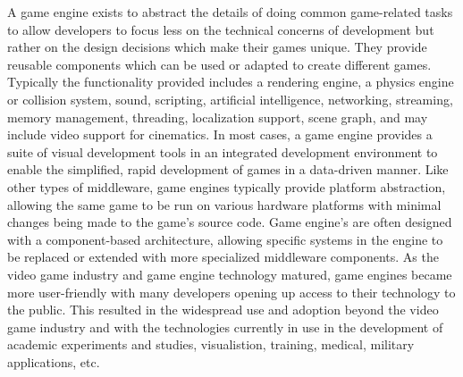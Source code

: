 \documentclass{l4proj}
\begin{document}
A game engine exists to abstract the details of doing common game-related tasks to allow developers to focus less on the technical concerns of development but rather on the design decisions which make their games unique. They provide reusable components which can be used or adapted to create different games. Typically the functionality provided includes a rendering engine, a physics engine or collision system, sound, scripting, artificial intelligence, networking, streaming, memory management, threading, localization support, scene graph, and may include video support for cinematics. In most cases, a game engine provides a suite of visual development tools in an integrated development environment to enable the simplified, rapid development of games in a data-driven manner. Like other types of middleware, game engines typically provide platform abstraction, allowing the same game to be run on various hardware platforms with minimal changes being made to the game’s source code. Game engine's are often designed with a component-based architecture, allowing specific systems in the engine to be replaced or extended with more specialized middleware components. As the video game industry and game engine technology matured, game engines became more user-friendly with many developers opening up access to their technology to the public. This resulted in the widespread use and adoption beyond the video game industry and with the technologies currently in use in the development of academic experiments and studies, visualistion, training, medical, military applications, etc. 
\end{document}
